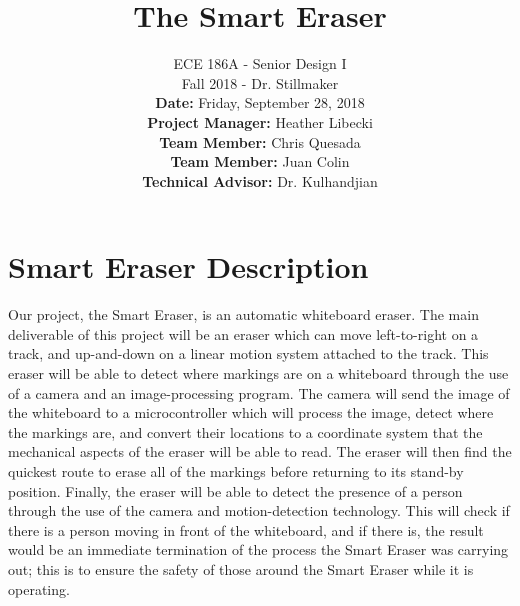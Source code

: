 \documentclass{IEEEtran}					%
\title{\vspace{2in}The Smart Eraser}	%
\author{ECE 186A - Senior Design I \\ 			%
	Fall 2018 - Dr. Stillmaker \\ 				%
	\vspace{12pt} 								%
	\textbf{Date:} Friday, September 28, 2018  \\ 
	\vspace{2in}								%
	\vspace{6pt}
	\textbf{Project Manager:} Heather Libecki			%
	\vspace{12pt}
	\underline{\hspace{3in}}\\					%
	\textbf{Team Member:} Chris Quesada
	\vspace{12pt}
	\underline{\hspace{3in}}\\
	\textbf{Team Member:} Juan Colin
	\vspace{12pt}
	\underline{\hspace{3in}}\\
	\textbf{Technical Advisor:} Dr. Kulhandjian
	\underline{\hspace{3in}} \\
	\vspace{12in}}								%
\begin{document}
	\thispagestyle{empty}						%
	
	\maketitle									%
	
	
	\section{Smart Eraser Description}
	\setlength{\parindent}{5ex}
	Our project, the Smart Eraser, is an automatic whiteboard eraser. The main deliverable of this project will be an eraser which can move left-to-right on a track, and up-and-down on a linear motion system attached to the track. This eraser will be able to detect where markings are on a whiteboard through the use of a camera and an image-processing program. The camera will send the image of the whiteboard to a microcontroller which will process the image, detect where the markings are, and convert their locations to a coordinate system that the mechanical aspects of the eraser will be able to read. The eraser will then find the quickest route to erase all of the markings before returning to its stand-by position. Finally, the eraser will be able to detect the presence of a person through the use of the camera and motion-detection technology. This will check if there is a person moving in front of the whiteboard, and if there is, the result would be an immediate termination of the process the Smart Eraser was carrying out; this is to ensure the safety of those around the Smart Eraser while it is operating.
	
\end{document}
